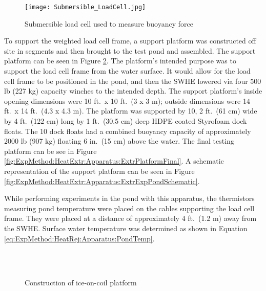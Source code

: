 	\begin{figure}
		\centering
		\texttt{[image: Submersible\_LoadCell.jpg]}
		\caption[Submersible load cell]{Submersible load cell used to measure buoyancy force}
		\label{fig:ExpMethod:HeatExtr:Apparatus:UWLoadCell}
	\end{figure}

To support the weighted load cell frame, a support platform was constructed off site in segments and then brought to the test pond and assembled. The support platform can be seen in Figure \ref{fig:ExpMethod:HeatExtr:Apparatus:ExtrPlatformBuildMain}. The platform's intended purpose was to support the load cell frame from the water surface. It would allow for the load cell frame to be positioned in the pond, and then the SWHE lowered via four 500 lb (227 kg) capacity winches to the intended depth. The support platform's inside opening dimensions were 10 ft.\ x 10 ft.\ (3 x 3 m); outside dimensions were 14 ft.\ x 14 ft.\ (4.3 x 4.3 m). The platform was supported by 10, 2 ft.\ (61 cm) wide by 4 ft.\ (122 cm) long by 1 ft.\ (30.5 cm) deep HDPE coated Styrofoam dock floats. The 10 dock floats had a combined buoyancy capacity of approximately 2000 lb (907 kg) floating 6 in.\ (15 cm) above the water. The final testing platform can be see in Figure \ref{fig:ExpMethod:HeatExtr:Apparatus:ExtrPlatformFinal}. A schematic representation of the support platform can be seen in Figure \ref{fig:ExpMethod:HeatExtr:Apparatus:ExtrExpPondSchematic}.

While performing experiments in the pond with this apparatus, the thermistors measuring pond temperature were placed on the cables supporting the load cell frame. They were placed at a distance of approximately 4 ft.\ (1.2 m) away from the SWHE. Surface water temperature was determined as shown in Equation \ref{eq:ExpMethod:HeatRej:Apparatus:PondTemp}.

	\begin{figure}
		\centering
		\,
		\\
		\,
		\caption[Construction of ice-on-coil platform]{Construction of ice-on-coil platform}
		\label{fig:ExpMethod:HeatExtr:Apparatus:ExtrPlatformBuildMain}
	\end{figure}

